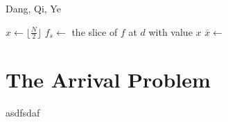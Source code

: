 \begin{algorithm}
  \caption{Dang, Qi, Ye}
  \begin{algorithmic}
  \State $x \gets \lfloor \frac{N}{2} \rfloor$
  \State $f_s \gets$ the slice of $f$ at $d$ with value $x$
    \State $\overline{x} \gets$ 

  \EndWhile
  \EndProcedure
  \end{algorithmic}
\end{algorithm}

\newpage
\section{The Arrival Problem}
asdfsdaf
